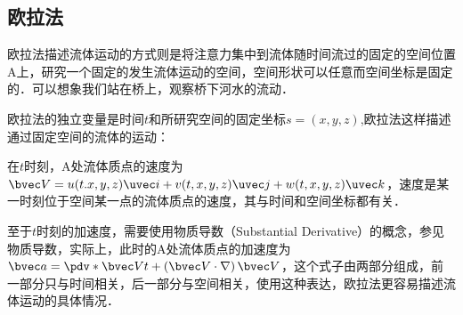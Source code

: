 \subsection{欧拉法}
欧拉法描述流体运动的方式则是将注意力集中到流体随时间流过的固定的空间位置A上，研究一个固定的发生流体运动的空间，空间形状可以任意而空间坐标是固定的．可以想象我们站在桥上，观察桥下河水的流动．

欧拉法的独立变量是时间$t$和所研究空间的固定坐标$s=(x,y,z)$,欧拉法这样描述通过固定空间的流体的运动：

在$t$时刻，A处流体质点的速度为$\bvec V=u(t.x,y,z)\uvec i+v(t,x,y,z)\uvec j+w(t,x,y,z)\uvec k$，速度是某一时刻位于空间某一点的流体质点的速度，其与时间和空间坐标都有关．

至于$t$时刻的加速度，需要使用物质导数（Substantial  Derivative）的概念，参见物质导数，实际上，此时的A处流体质点的加速度为$\bvec a=\pdv*{\bvec V}{t}+\left ( \bvec V\cdot \nabla \right )\bvec V$，这个式子由两部分组成，前一部分只与时间相关，后一部分与空间相关，使用这种表达，欧拉法更容易描述流体运动的具体情况．

